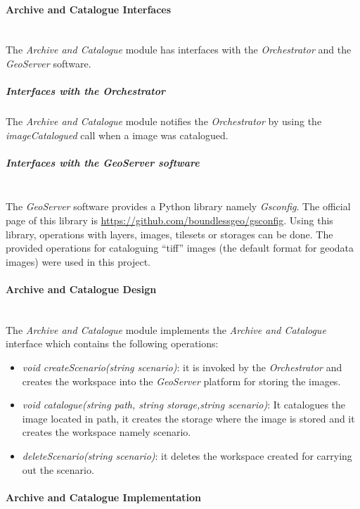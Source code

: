 \paragraph{Archive and Catalogue Interfaces}~\\

The \emph{Archive and Catalogue} module has interfaces with the
\emph{Orchestrator} and the \emph{GeoServer} software.

\subparagraph{Interfaces with the Orchestrator}

The \emph{Archive and Catalogue} module notifies the \emph{Orchestrator} by
using the \emph{imageCatalogued} call when a
image was catalogued.

\subparagraph{Interfaces with the GeoServer software}~\\

The \emph{GeoServer} software provides a Python library namely
\emph{Gsconfig}. The official page of this library is
\url{https://github.com/boundlessgeo/gsconfig}. Using this library, operations
with layers, images, tilesets or storages can be done. The provided operations
for cataloguing ``tiff'' images (the default format for geodata images) were
used in this project.

\paragraph{Archive and Catalogue Design}~\\

The \emph{Archive and Catalogue} module implements the \emph{Archive and
  Catalogue} interface which contains the following operations:

\begin{itemize}
\item \emph{void createScenario(string scenario)}: it is invoked by the
  \emph{Orchestrator} and creates the workspace into the \emph{GeoServer}
  platform for storing the images.
\item \emph{void catalogue(string path, string storage,string scenario)}: It
  catalogues the image located in path, it creates the storage where the image is
  stored and it creates the workspace namely scenario.
\item \emph{deleteScenario(string scenario)}: it deletes the workspace created
  for carrying out the scenario.
\end{itemize}


\paragraph{Archive and Catalogue Implementation}~\\

